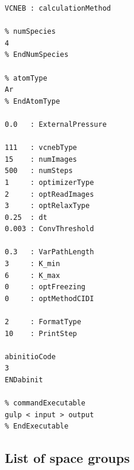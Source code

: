 \documentclass[12pt]{article}
\begin{document}
\lstset{language=MATLAB, frame=single, basicstyle=\small}
\begin{lstlisting}
VCNEB : calculationMethod

% numSpecies
4
% EndNumSpecies

% atomType
Ar
% EndAtomType

0.0   : ExternalPressure

111   : vcnebType   
15    : numImages
500   : numSteps
1     : optimizerType
2     : optReadImages
3     : optRelaxType
0.25  : dt
0.003 : ConvThreshold

0.3   : VarPathLength
3     : K_min
6     : K_max
0     : optFreezing
0     : optMethodCIDI

2     : FormatType 
10    : PrintStep

abinitioCode
3
ENDabinit

% commandExecutable
gulp < input > output
% EndExecutable
\end{lstlisting}

\newpage
\subsection{List of space groups} \label{appendix_space_groups}
\end{document}

